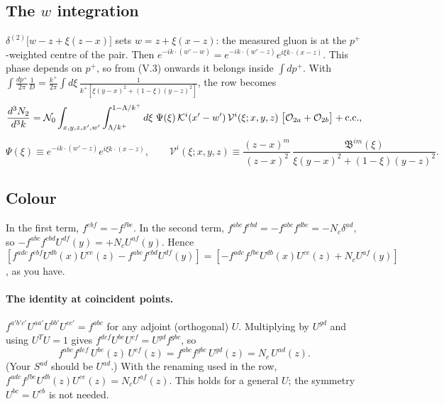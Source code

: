 \documentclass[10pt]{article}
\numberwithin{equation}{section}
\newcommand{\KK}{\mathcal K}
\newcommand{\Nz}{\mathcal N_0}
\newcommand{\OO}{\mathcal O}
\newcommand{\VV}{\mathcal V}
\begin{document}
\subsection{The \texorpdfstring{$w$}{w} integration}
$\delta^{(2)}\big[w-z+\xi(z-x)\big]$ sets $w=z+\xi(x-z)$: the measured gluon is at the $p^+$-weighted centre of the pair. Then $e^{-ik\cdot(w'-w)}=e^{-ik\cdot(w'-z)}e^{i\xi k\cdot(x-z)}$. This phase depends on $p^+$, so from (V.3) onwards it belongs inside $\int dp^+$. With $\int\frac{dp^+}{2\pi}\frac{1}{D}=\frac{k^+}{2\pi}\int d\xi\,\frac{1}{k^+[\xi(y-x)^2+(1-\xi)(y-z)^2]}$, the row becomes
\begin{equation}
\frac{d^3N_{2}}{d^3k}=\Nz\int_{x,y,z,x',w'}\int_{\Lambda/k^+}^{1-\Lambda/k^+}d\xi\;\Psi(\xi)\,\KK^i(x'-w')\,\VV^i(\xi;x,y,z)\;\big[\OO_{2a}+\OO_{2b}\big]+{\rm c.c.},
\label{eq:compact}
\end{equation}
\begin{equation}
\Psi(\xi)\equiv e^{-ik\cdot(w'-z)}e^{i\xi k\cdot(x-z)},\qquad
\VV^i(\xi;x,y,z)\equiv\frac{(z-x)^m}{(z-x)^2}\,\frac{\mathfrak B^{im}(\xi)}{\xi(y-x)^2+(1-\xi)(y-z)^2}.
\end{equation}

\subsection{Colour}
In the first term, $f^{ebf}=-f^{fbe}$. In the second term, $f^{abc}f^{cbd}=-f^{abc}f^{dbc}=-N_c\delta^{ad}$, so $-f^{abc}f^{cbd}U^{df}(y)=+N_cU^{af}(y)$. Hence
$[f^{adc}f^{ebf}U^{db}(x)U^{ce}(z)-f^{abc}f^{cbd}U^{df}(y)]=[-f^{adc}f^{fbe}U^{db}(x)U^{ce}(z)+N_cU^{af}(y)]$, as you have.

\paragraph{The identity at coincident points.} $f^{a'b'c'}U^{aa'}U^{bb'}U^{cc'}=f^{abc}$ for any adjoint (orthogonal) $U$. Multiplying by $U^{gd}$ and using $U^TU=1$ gives $f^{def}U^{be}U^{cf}=U^{gd}f^{gbc}$, so
\begin{equation}
f^{abc}f^{def}\,U^{be}(z)\,U^{cf}(z)=f^{abc}f^{gbc}\,U^{gd}(z)=N_c\,U^{ad}(z).
\end{equation}
(Your $S^{ad}$ should be $U^{ad}$.) With the renaming used in the row, $f^{adc}f^{fbe}U^{db}(z)U^{ce}(z)=N_cU^{af}(z)$. This holds for a general $U$; the symmetry $U^{bc}=U^{cb}$ is not needed.
\end{document}
